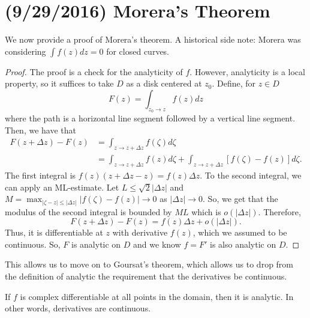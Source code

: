 \documentclass[11pt,leqno,oneside]{amsart}
\numberwithin{thm}{section}
\begin{document}
  \section{(9/29/2016) Morera's Theorem}
  We now provide a proof of Morera's theorem. A historical side note:
  Morera was considering $\int f(z)dz = 0$ for closed curves.
  \begin{proof}
    The proof is a check for the analyticity of $f$. However,
    analyticity is a local property, so it suffices to take $D$ as a
    disk centered at $z_0$. Define, for $z \in D$ \[
      F(z) = \int_{z_0 \to z} f(z)dz
    \]
    where the path is a horizontal line segment followed by a vertical
    line segment. Then, we have that
    \begin{align*}
      F(z+\Delta z) - F(z) & = \int_{z \to z+ \Delta z} f(\zeta)
                             d\zeta \\
      \ & = \int_{z \to z+\Delta z} f(z)d\zeta + \int_{z \to z +
          \Delta z} [f(\zeta) - f(z)]d\zeta.
    \end{align*}
    The first integral is $f(z)(z+\Delta z - z) = f(z) \Delta z$. To the
    second integral, we can apply an ML-estimate. Let $L \leq \sqrt{2}
    | \Delta z|$ and $M = \max_{|\zeta - z| \leq |\Delta z|} | f(\zeta) - f(z)| \to 0$ as $|\Delta
    z| \to 0$. So, we get
    that the modulus of the second integral is bounded by $ML$ which
    is $o(|\Delta z|)$. Therefore, \[
      F(z+\Delta z) - F(z) = f(z) \Delta z + o(|\Delta z|).
    \]
    Thus, it is differentiable at $z$ with derivative $f(z)$, which we
    assumed to be continuous. So, $F$ is analytic on $D$ and we know
    $f = F'$ is also analytic on $D$.
  \end{proof}
  This allows us to move on to Goursat's theorem, which allows us to
  drop from the definition of analytic the requirement that the
  derivatives be continuous.
  \begin{thm}
    If $f$ is complex differentiable at all points in the domain, then
    it is analytic. In other words, derivatives are continuous.
  \end{thm}
\end{document}
